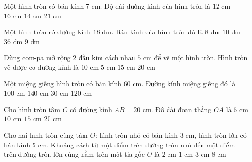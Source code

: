 \begin{ex} %
Một hình tròn có bán kính $7\text{ cm}$. Độ dài đường kính của hình tròn là
\choice
{$12\text{ cm}$}
{$16\text{ cm}$}
{\True $14\text{ cm}$}
{$21\text{ cm}$}
\end{ex}

\begin{ex} %
Một hình tròn có đường kính $18\text{ dm}$. Bán kính của hình tròn đó là
\choice
{$8\text{ dm}$}
{$10\text{ dm}$}
{$36\text{ dm}$}
{\True $9\text{ dm}$}
\end{ex}

\begin{ex} %
Dùng com-pa mở rộng 2 đầu kim cách nhau $5\text{ cm}$ để vẽ một hình tròn. Hình tròn vẽ được có đường kính là
\choice
{\True $10\text{ cm}$}
{$5\text{ cm}$}
{$15\text{ cm}$}
{$20\text{ cm}$}
\end{ex}

\begin{ex} %
Một miệng giếng hình tròn có bán kính $60\text{ cm}$. Đường kính miệng giếng đó là
\choice
{$100\text{ cm}$}
{$140\text{ cm}$}
{$30\text{ cm}$}
{\True $120\text{ cm}$}
\end{ex}

\begin{ex} %
Cho hình tròn tâm $O$ có đường kính $AB = 20\text{ cm}$. Độ dài đoạn thẳng $OA$ là
\choice
{$5\text{ cm}$}
{\True $10\text{ cm}$}
{$15\text{ cm}$}
{$20\text{ cm}$}
\end{ex}

\begin{ex} %
Cho hai hình tròn cùng tâm $O$: hình tròn nhỏ có bán kính $3\text{ cm}$, hình tròn lớn có bán kính $5\text{ cm}$. Khoảng cách từ một điểm trên đường tròn nhỏ đến một điểm trên đường tròn lớn cùng nằm trên một tia gốc $O$ là
\choice
{\True $2\text{ cm}$}
{$1\text{ cm}$}
{$3\text{ cm}$}
{$8\text{ cm}$}
\end{ex}

